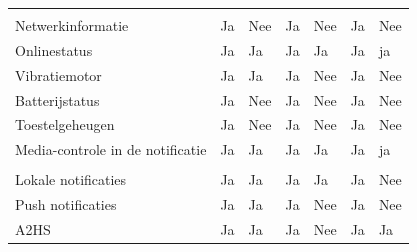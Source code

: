 \begin{table}[]
\begin{tabular}{p{6cm}p{13mm}p{15mm}p{13mm}p{13mm}p{13mm}p{13mm}}
			 &  & &  &  &  &  \\
			 
			  Netwerkinformatie & \cellcolor{green!40} Ja  &  \cellcolor{red!50} Nee & \cellcolor{green!40} Ja  & \cellcolor{red!50} Nee & \cellcolor{green!40} Ja &  \cellcolor{red!50} Nee \\
			  
			  Onlinestatus & \cellcolor{green!40} Ja  & \cellcolor{green!40} Ja & \cellcolor{green!40} Ja  & \cellcolor{green!40} Ja & \cellcolor{green!40} Ja & \cellcolor{green!40} ja \\
			  
			  Vibratiemotor & \cellcolor{green!40} Ja  & \cellcolor{green!40} Ja & \cellcolor{green!40} Ja & \cellcolor{red!50} Nee  & \cellcolor{green!40} Ja & \cellcolor{red!50} Nee \\
			  
			  Batterijstatus & \cellcolor{green!40} Ja  &  \cellcolor{red!50} Nee & \cellcolor{green!40} Ja  & \cellcolor{red!50} Nee & \cellcolor{green!40} Ja &  \cellcolor{red!50} Nee \\
			  
			  Toestelgeheugen & \cellcolor{green!40} Ja  &  \cellcolor{red!50} Nee & \cellcolor{green!40} Ja  & \cellcolor{red!50} Nee & \cellcolor{green!40} Ja &  \cellcolor{red!50} Nee \\
			  
			  Media-controle in de notificatie & \cellcolor{green!40} Ja  & \cellcolor{green!40} Ja & \cellcolor{green!40} Ja  & \cellcolor{green!40} Ja & \cellcolor{green!40} Ja & \cellcolor{green!40} ja \\
			  
			   &  & &  &  &  &  \\
			   
			   Lokale notificaties & \cellcolor{green!40} Ja  & \cellcolor{green!40} Ja & \cellcolor{green!40} Ja  & \cellcolor{green!40} Ja & \cellcolor{green!40} Ja &  \cellcolor{red!50} Nee \\
			   
			   Push notificaties  & \cellcolor{green!40} Ja  & \cellcolor{green!40} Ja & \cellcolor{green!40} Ja & \cellcolor{red!50} Nee  & \cellcolor{green!40} Ja & \cellcolor{red!50} Nee \\
			   
			   A2HS & \cellcolor{green!40} Ja  & \cellcolor{green!40} Ja & \cellcolor{green!40} Ja & \cellcolor{red!50} Nee  & \cellcolor{green!40} Ja & \cellcolor{green!40} Ja \\
			   

\end{tabular}
\end{table}
